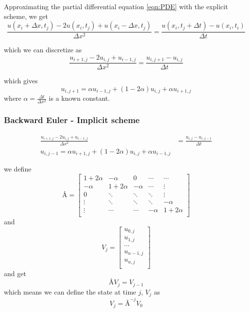 \documentclass[10pt,a4paper]{article}
\begin{document}
Approximating the partial differential equation \ref{eqn:PDE} with the explicit scheme, we get
\begin{equation}
\frac{u(x_i + \Delta x, t_j) - 2u(x_i,t_j) + u(x_i - \Delta x, t_j)}{\Delta x^2}
= \frac{u(x_i, t_j + \Delta t) - u(x_i, t_i)}{\Delta t}
\end{equation}

which we can discretize as
\begin{equation}
\frac{u_{i+1,j} - 2u_{i,j}+u_{i-1,j}}{\Delta x^2} = \frac{u_{i,j+1} - u_{i,j}}{\Delta t}
\end{equation}

which gives
\begin{equation}
u_{i,j+1} = \alpha u_{i-1,j} + (1-2\alpha)u_{i,j} + \alpha u_{i+1,j}
\end{equation}
where $\alpha = \frac{\Delta t}{\Delta x^2}$ is a known constant.


\subsubsection{Backward Euler - Implicit scheme}
\begin{align}
\frac{u_{i+1,j} - 2u_{i,j}+u_{i-1,j}}{\Delta x^2} &= \frac{u_{i,j} - u_{i,j-1}}{\Delta t} \\
u_{i,j-1} = \alpha u_{i+1,j} + (1 - 2\alpha )u_{i,j} + \alpha u_{i-1,j}
\end{align}

we define
\[
Â = \begin{bmatrix}
1+2\alpha & -\alpha & 0 & \cdots & \cdots \\
-\alpha & 1+2\alpha & -\alpha & \cdots & \vdots \\
0 & \ddots & \ddots & \ddots & \vdots \\
\vdots & \ddots & \ddots & \ddots & -\alpha \\
\vdots & \cdots & \cdots & -\alpha & 1+2\alpha \\
\end{bmatrix}
\]
and
\[ V_j = \begin{bmatrix}
u_{0,j}\\
u_{1,j}\\
\cdots\\
u_{n-1,j}\\
u_{n,j}\\
\end{bmatrix}
\]
and get
\begin{equation}
ÂV_j = V_{j-1}
\end{equation}
which means we can define the state at time $j$, $V_j$ as
\begin{equation}
V_j = Â^{-j}V_0
\end{equation}
\end{document}
